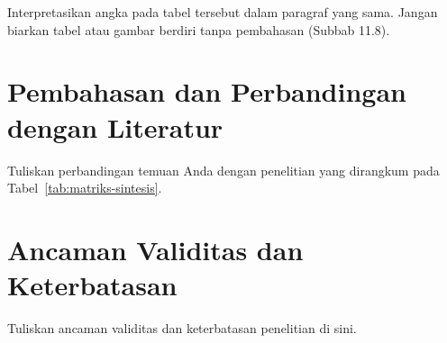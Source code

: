 Interpretasikan angka pada tabel tersebut dalam paragraf yang sama.
Jangan biarkan tabel atau gambar berdiri tanpa pembahasan (Subbab 11.8).

\section{Pembahasan dan Perbandingan dengan Literatur}
\label{sec:pembahasan}


Tuliskan perbandingan temuan Anda dengan penelitian yang dirangkum pada
Tabel~\ref{tab:matriks-sintesis}.

\section{Ancaman Validitas dan Keterbatasan}
\label{sec:ancaman-validitas}


Tuliskan ancaman validitas dan keterbatasan penelitian di sini.

